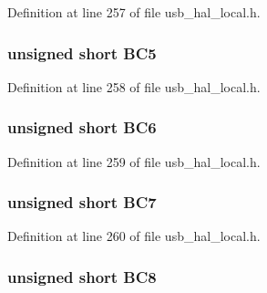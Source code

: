 Definition at line 257 of file usb\+\_\+hal\+\_\+local.\+h.

\hypertarget{union___b_y_t_e_c_o_u_n_t_a7e3c6866f989c2c76bb59cd1d1d9efad}{}
\subsubsection[{B\+C5}]{\setlength{\rightskip}{0pt plus 5cm}unsigned short B\+C5}\label{union___b_y_t_e_c_o_u_n_t_a7e3c6866f989c2c76bb59cd1d1d9efad}


Definition at line 258 of file usb\+\_\+hal\+\_\+local.\+h.

\hypertarget{union___b_y_t_e_c_o_u_n_t_a56573e0ab524655569e3ca5982ee32dd}{}
\subsubsection[{B\+C6}]{\setlength{\rightskip}{0pt plus 5cm}unsigned short B\+C6}\label{union___b_y_t_e_c_o_u_n_t_a56573e0ab524655569e3ca5982ee32dd}


Definition at line 259 of file usb\+\_\+hal\+\_\+local.\+h.

\hypertarget{union___b_y_t_e_c_o_u_n_t_a346a9190c422dc01c8ab2fbf8d45a470}{}
\subsubsection[{B\+C7}]{\setlength{\rightskip}{0pt plus 5cm}unsigned short B\+C7}\label{union___b_y_t_e_c_o_u_n_t_a346a9190c422dc01c8ab2fbf8d45a470}


Definition at line 260 of file usb\+\_\+hal\+\_\+local.\+h.

\hypertarget{union___b_y_t_e_c_o_u_n_t_a7e1a2cb638b416d81d578886794c1a96}{}
\subsubsection[{B\+C8}]{\setlength{\rightskip}{0pt plus 5cm}unsigned short B\+C8}\label{union___b_y_t_e_c_o_u_n_t_a7e1a2cb638b416d81d578886794c1a96}


